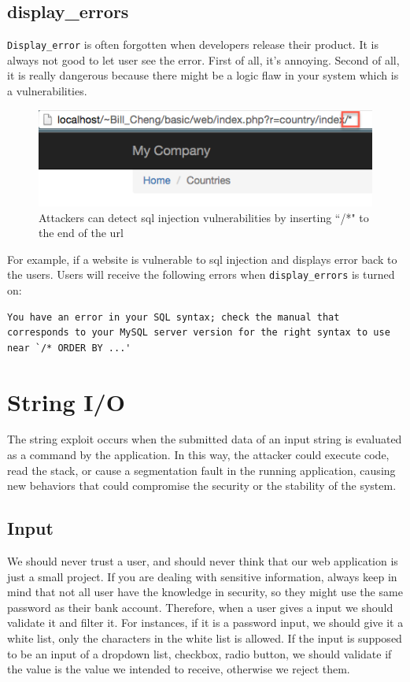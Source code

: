 \documentclass[conference]{IEEEtran}
\begin{document}
\subsection{display\_errors}
\texttt{Display\_error} is often forgotten when developers release their product. It is always not good to let user see the error. First of all, it's annoying. Second of all, it is really dangerous because there might be a logic flaw in your system which is a vulnerabilities. 
\begin{figure}[h]
\includegraphics[scale=0.45]{displayerror}
\centering
\caption{Attackers can detect sql injection vulnerabilities by inserting ``/*" to the end of the url}
\end{figure}
For example, if a website is vulnerable to sql injection and displays error back to the users. Users will receive the following errors when \texttt{display\_errors} is turned on: \\
\begin{lstlisting}
You have an error in your SQL syntax; check the manual that corresponds to your MySQL server version for the right syntax to use near `/* ORDER BY ...'
\end{lstlisting}
\section{String I/O}
The string exploit occurs when the submitted data of an input string is evaluated as a command by the application. In this way, the attacker could execute code, read the stack, or cause a segmentation fault in the running application, causing new behaviors that could compromise the security or the stability of the system.

\subsection{Input}
We should never trust a user, and should never think that our web application is just a small project. If you are dealing with sensitive information, always keep in mind that not all user have the knowledge in security, so they might use the same password as their bank account. Therefore, when a user gives a input we should validate it and filter it. For instances, if it is a password input, we should give it a white list, only the characters in the white list is allowed. If the input is supposed to be an input of a dropdown list, checkbox, radio button, we should validate if the value is the value we intended to receive, otherwise we reject them.
\end{document}
